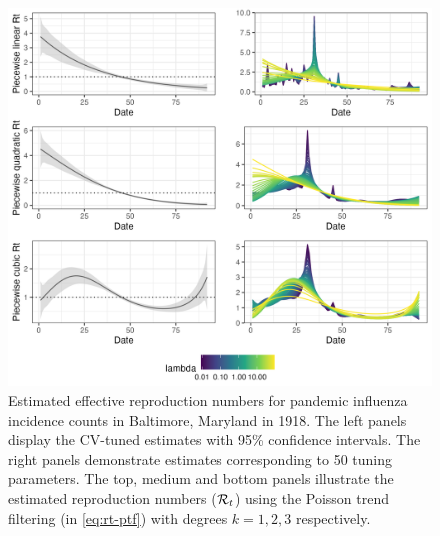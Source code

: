 \begin{figure}[tb]
    \centering
    \includegraphics[width=0.9\linewidth]{fig/flu_full_res.png}
    \caption{Estimated effective reproduction numbers for pandemic influenza incidence counts in Baltimore, Maryland in 1918. The left panels display the CV-tuned estimates with 95\% confidence intervals. The right panels demonstrate estimates corresponding to 50 tuning parameters. The top, medium and bottom panels illustrate the estimated reproduction numbers ($\mathcal{R}_t$) using the Poisson trend filtering (in \eqref{eq:rt-ptf}) with degrees $k=1,2,3$ respectively.} 
    \label{fig:flu-res}
\end{figure} 

